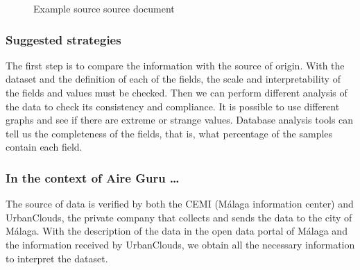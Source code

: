 \begin{figure}[ht]
\centering
{}
\caption{Example source source document}
\end{figure}

\subsubsection*{Suggested strategies} 
The first step is to compare the information with the source of origin. With the dataset and the definition
of each of the fields, the scale and interpretability of the fields and values must be checked.
Then we can perform different analysis of the data to check its consistency and compliance.
It is possible to use different graphs and see if there are extreme or strange values.
Database analysis tools can tell us the completeness of the fields, that is, what percentage of the
samples contain each field.

\subsubsection*{In the context of Aire Guru \ldots} 
The source of data is verified by both the CEMI (Málaga information center) and UrbanClouds, the private company
that collects and sends the data to the city of Málaga.
With the description of the data in the open data portal of Málaga and the information received by UrbanClouds,
we obtain all the necessary information to interpret the dataset. \\

